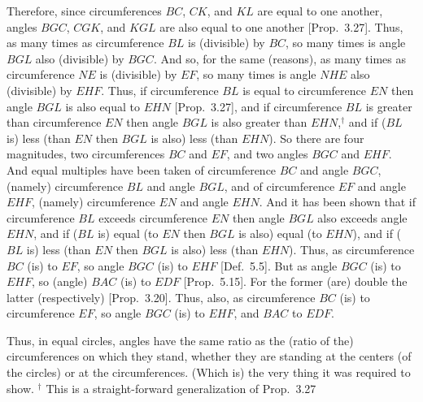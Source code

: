 Therefore, since circumferences $BC$, $CK$, and $KL$ are equal to one
another, angles $BGC$, $CGK$, and $KGL$ are also equal to
one another [Prop.~3.27].  Thus, as many times as circumference $BL$
is (divisible) by $BC$, so many times is angle $BGL$ also
(divisible) by $BGC$. And so, for the same (reasons), as many times as
circumference $NE$ is (divisible) by $EF$, so many times is
angle $NHE$ also (divisible) by $EHF$. Thus, if circumference $BL$
is equal to circumference $EN$ then angle $BGL$ is also equal to $EHN$ [Prop.~3.27], and
if circumference $BL$ is greater than circumference $EN$ then angle
$BGL$ is also greater than $EHN$,$^\dag$ and if ($BL$ is) less (than $EN$ then $BGL$ is also) less (than $EHN$). So there are four magnitudes, two circumferences
$BC$ and $EF$, and two angles $BGC$ and $EHF$. And equal multiples
have been taken of circumference $BC$ and angle $BGC$, (namely)
circumference $BL$ and angle $BGL$, and of circumference $EF$ and angle
$EHF$, (namely) circumference $EN$ and angle $EHN$. And it has been
shown that if circumference $BL$ exceeds circumference
$EN$ then angle $BGL$ also exceeds angle $EHN$, and if ($BL$ is) equal (to $EN$
then $BGL$ is also) equal (to $EHN$), and if ($BL$ is) less (than $EN$
then $BGL$ is also) less (than $EHN$). Thus, as circumference
$BC$ (is) to $EF$, so angle $BGC$ (is) to $EHF$ [Def.~5.5]. But as
angle $BGC$ (is) to $EHF$, so  (angle) $BAC$ (is) to $EDF$ [Prop.~5.15]. For the former (are) double the
latter (respectively) [Prop.~3.20]. Thus, also, as circumference $BC$ (is)
to circumference $EF$, so  angle $BGC$ (is) to $EHF$, and $BAC$ to $EDF$.

Thus, in equal circles,  angles have the same ratio
as the (ratio of the) circumferences on which they stand, whether they are standing at
the centers (of the circles) or at the circumferences. (Which is) the very thing it was required to show.
{\footnotesize\noindent$^\dag$ This is a straight-forward generalization of Prop.~3.27}
